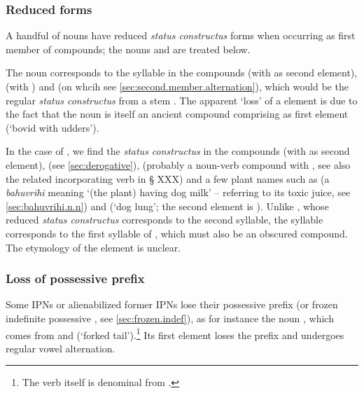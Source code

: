 \subsubsection{Reduced forms} \label{sec:reduced.forms.compounds}   
A handful of nouns have reduced \textit{status constructus} forms when occurring as first member of compounds; the nouns  and  are treated below. 

The noun  corresponds to the syllable  in the compounds  (with  as second element),  (with ) and  (on whcih see \ref{sec:second.member.alternation}), which would be the regular \textit{status constructus} from a stem . The apparent `loss' of a  element is due to the fact that the noun  is itself an ancient compound comprising  as first element (`bovid with udders').

In the case of , we find the \textit{status constructus}  in the compounds  (with  as second element),  (see \ref{sec:derogative}),  (probably a noun-verb compound with , see also the related incorporating verb in § XXX) and a few plant names such as  (a \textit{bahuvrīhi} meaning `(the plant) having dog milk' -- referring to its toxic juice, see \ref{sec:bahuvrihi.n.n}) and  (`dog lung'; the second element is ). Unlike  , whose reduced \textit{status constructus} corresponds to the second syllable, the syllable  corresponds to the first syllable of , which must also be an obscured compound. The etymology of  the element  is unclear.

\subsubsection{Loss of possessive prefix} \label{sec:loss.possessive.prefix.compounds}
Some IPNs or alienabilized former IPNs lose their possessive prefix (or frozen indefinite possessive , see \ref{sec:frozen.indef}), as for instance the noun  , which comes from  and  (`forked tail').\footnote{The verb  itself is denominal from .} Its first element  loses the prefix  and undergoes regular vowel alternation.

